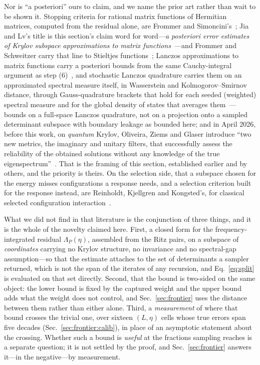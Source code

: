 Nor is ``a posteriori'' ours to claim, and we name the prior art rather than wait to be shown it.
Stopping criteria for rational matrix functions of Hermitian matrices, computed from the residual
alone, are Frommer and Simoncini's~\cite{frommersimoncini2008}; Jia and Lv's title is this section's
claim word for word---\emph{a posteriori error estimates of Krylov subspace approximations to matrix
functions}~\cite{jialv2015}---and Frommer and Schweitzer carry that line to Stieltjes
functions~\cite{frommerschweitzer2016}; Lanczos approximations to matrix functions carry a posteriori bounds from the same Cauchy-integral argument as step (6)~\cite{chen2022lanczos,xuchen2025block}, and stochastic Lanczos quadrature carries them on an approximated spectral measure itself, in Wasserstein and Kolmogorov--Smirnov distance, through Gauss-quadrature brackets that hold for each seeded (weighted) spectral measure and for the global density of states that averages them~\cite{chen2021slq}---bounds on a full-space Lanczos quadrature, not on a projection onto a sampled determinant subspace with boundary leakage as bounded here; and in April 2026, before this work, on \emph{quantum} Krylov,
Oliveira, Ziems and Glaser introduce ``two new metrics, the imaginary and unitary filters, that
successfully assess the reliability of the obtained solutions without any knowledge of the true
eigenspectrum''~\cite{oliveira2026}. That is the framing of this section, established earlier and by others, and the priority is theirs. On the selection side, that a subspace chosen for the energy misses configurations a response needs, and a selection criterion built for the response instead, are Reinholdt, Kjellgren and Kongsted's, for classical selected configuration interaction~\cite{reinholdt2026lr}.

What we did not find in that literature is the conjunction of three things, and it is the whole of the
novelty claimed here. First, a closed form for the frequency-integrated residual $\Lambda_P(\eta)$, assembled from the Ritz pairs, on a subspace of \emph{coordinates} carrying no Krylov structure, no invariance and no spectral-gap assumption---so that the estimate
attaches to the set of determinants a sampler returned, which is not the span of the iterates of any
recursion, and Eq.~\eqref{eq:split} is evaluated on that set directly. Second, that the bound is
two-sided on the same object: the lower bound is fixed by the captured weight and the upper bound adds what the weight does not control, and Sec.~\ref{sec:frontier} uses the distance between them rather than either alone.
Third, a \emph{measurement} of where that bound crosses the trivial one, over sixteen
$(L,\eta)$ cells whose true errors span five decades (Sec.~\ref{sec:frontier:calib}), in place of an
asymptotic statement about the crossing. Whether such a bound is \emph{useful} at the
fractions sampling reaches is a separate question; it is not settled by the proof, and
Sec.~\ref{sec:frontier} answers it---in the negative---by measurement.

